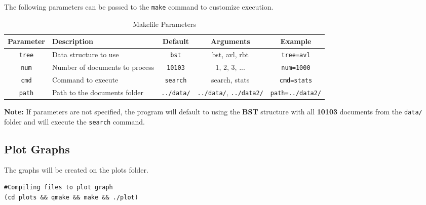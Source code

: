 The following parameters can be passed to the \texttt{make} command to customize execution.

\begin{table}[H]
\centering
\renewcommand{\arraystretch}{1.3}
\begin{tabular}{|c|>{\centering\arraybackslash}p{6cm}|c|c|c|} 
\hline
\textbf{Parameter} & \textbf{Description} & \textbf{Default} & \textbf{Arguments} & \textbf{Example} \\
\hline
\texttt{tree} & Data structure to use & \texttt{bst} & bst, avl, rbt & \texttt{tree=avl} \\
\texttt{num} & Number of documents to process & \texttt{10103} & 1, 2, 3, ... & \texttt{num=1000} \\
\texttt{cmd} & Command to execute & \texttt{search} & search, stats & \texttt{cmd=stats} \\
\texttt{path} & Path to the documents folder & \texttt{../data/} & \texttt{../data/}, \texttt{../data2/} & \texttt{path=../data2/} \\
\hline
\end{tabular}
\caption{Makefile Parameters}
\label{tab:config_params}
\end{table}

\textbf{Note:} If parameters are not specified, the program will default to using the \textbf{BST} structure with all \textbf{10103} documents from the \texttt{data/} folder and will execute the \texttt{search} command.

\subsection{Plot Graphs}


The graphs will be created on the plots folder.

    \begin{verbatim}
#Compiling files to plot graph
(cd plots && qmake && make && ./plot)
    \end{verbatim}

